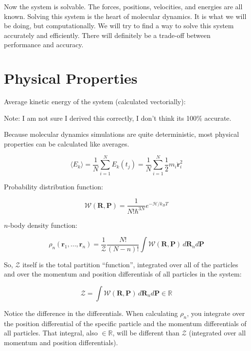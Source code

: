 \documentclass{article}
\begin{document}
Now the system is solvable. The forces, positions, velocities, and energies are all known. Solving this system is the heart of molecular dynamics. It is what we will be doing, but computationally. We will try to find a way to solve this system accurately and efficiently. There will definitely be a trade-off between performance and accuracy.

\section{Physical Properties}

Average kinetic energy of the system (calculated vectorially):

Note: I am not sure I derived this correctly, I don't think its 100\% accurate.

Because molecular dynamics simulations are quite deterministic, most physical properties can be calculated like averages.

\begin{equation}
    \langle E_k \rangle = \frac{1}{N}\sum_{i=1}^N E_k(t_j) = \frac{1}{N}\sum_{i=1}^N \frac{1}{2}m_i \dot{\mathbf{r}}_i^2
\end{equation}

Probability distribution function:

\begin{equation}
    \mathcal{W}(\mathbf{R}, \mathbf{P}) = \frac{1}{N! \hbar^{3N}}e^{-\mathcal{H}/k_B T}
\end{equation}

$n$-body density function:

\begin{equation}
    \rho_n(\mathbf{r}_1, ..., \mathbf{r}_n) = \frac{1}{\mathcal{Z}} \frac{N!}{(N-n)!} \int \mathcal{W}(\mathbf{R}, \mathbf{P})\,d\mathbf{R}_n d\mathbf{P}
\end{equation}

So, $\mathcal{Z}$ itself is the total partition ``function'', integrated over all of the particles and over the momentum and position differentials of all particles in the system:

\begin{equation}
    \mathcal{Z} = \int \mathcal{W}(\mathbf{R, P}) \, d\mathbf{R}_n d\mathbf{P} \in \mathbb{R}
\end{equation}

Notice the difference in the differentials. When calculating $\rho_n$, you integrate over the position differential of the specific particle and the momentum differentials of all particles. That integral, also $\in \mathbb{R}$, will be different than $\mathcal{Z}$ (integrated over all momentum and position differentials).
\end{document}
